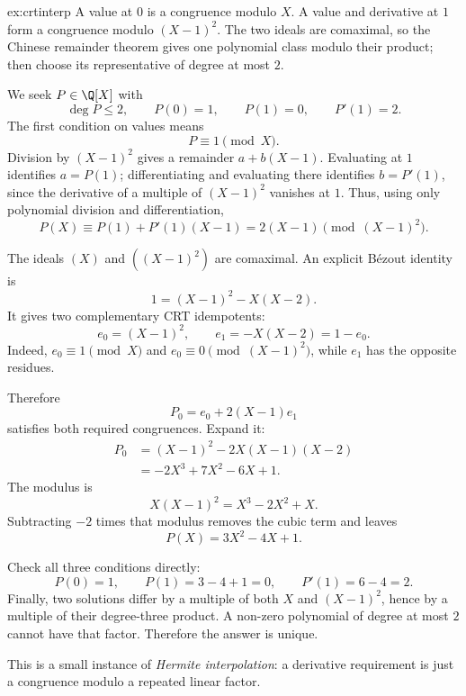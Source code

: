\begin{solution}{ex:crtinterp}
\idea A value at $0$ is a congruence modulo $X$. A value and derivative at $1$ form a congruence modulo $(X-1)^2$. The two ideals are comaximal, so the Chinese remainder theorem gives one polynomial class modulo their product; then choose its representative of degree at most $2$.

\writeup We seek $P\in\Q[X]$ with
\[
\deg P\le2,\qquad P(0)=1,\qquad P(1)=0,\qquad P'(1)=2.
\]
The first condition on values means
\[
P\equiv1\pmod X.
\]
Division by $(X-1)^2$ gives a remainder $a+b(X-1)$. Evaluating at $1$
identifies $a=P(1)$; differentiating and evaluating there identifies
$b=P'(1)$, since the derivative of a multiple of $(X-1)^2$ vanishes
at $1$. Thus, using only polynomial division and differentiation,
\[
P(X)\equiv P(1)+P'(1)(X-1)
=2(X-1)\pmod{(X-1)^2}.
\]

The ideals $(X)$ and $((X-1)^2)$ are comaximal. An explicit Bézout identity is
\[
1=(X-1)^2-X(X-2).
\]
It gives two complementary CRT idempotents:
\[
e_0=(X-1)^2,\qquad e_1=-X(X-2)=1-e_0.
\]
Indeed, $e_0\equiv1\pmod X$ and $e_0\equiv0\pmod{(X-1)^2}$, while $e_1$ has the opposite residues.

Therefore
\[
P_0=e_0+2(X-1)e_1
\]
satisfies both required congruences. Expand it:
\[
\begin{aligned}
P_0
&=(X-1)^2-2X(X-1)(X-2)\\
&=-2X^3+7X^2-6X+1.
\end{aligned}
\]
The modulus is
\[
X(X-1)^2=X^3-2X^2+X.
\]
Subtracting $-2$ times that modulus removes the cubic term and leaves
\[
\boxed{P(X)=3X^2-4X+1}.
\]

Check all three conditions directly:
\[
P(0)=1,\qquad P(1)=3-4+1=0,\qquad
P'(1)=6-4=2.
\]
Finally, two solutions differ by a multiple of both $X$ and $(X-1)^2$, hence by a multiple of their degree-three product. A non-zero polynomial of degree at most $2$ cannot have that factor. Therefore the answer is unique.

This is a small instance of \emph{Hermite interpolation}: a derivative requirement is just a congruence modulo a repeated linear factor.
\end{solution}

